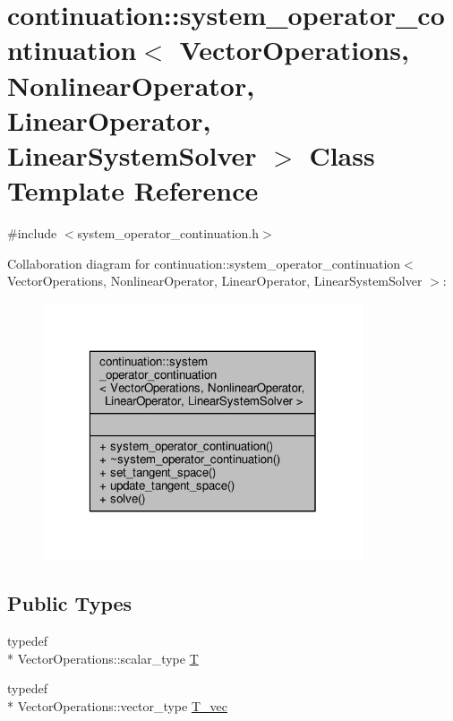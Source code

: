 \hypertarget{classcontinuation_1_1system__operator__continuation}{\section{continuation\-:\-:system\-\_\-operator\-\_\-continuation$<$ Vector\-Operations, Nonlinear\-Operator, Linear\-Operator, Linear\-System\-Solver $>$ Class Template Reference}
\label{classcontinuation_1_1system__operator__continuation}
}


{\ttfamily \#include $<$system\-\_\-operator\-\_\-continuation.\-h$>$}



Collaboration diagram for continuation\-:\-:system\-\_\-operator\-\_\-continuation$<$ Vector\-Operations, Nonlinear\-Operator, Linear\-Operator, Linear\-System\-Solver $>$\-:
\nopagebreak
\begin{figure}[H]
\begin{center}
\leavevmode
\includegraphics[width=268pt]{classcontinuation_1_1system__operator__continuation__coll__graph}
\end{center}
\end{figure}
\subsection*{Public Types}
\begin{DoxyCompactItemize}
\item 
typedef \\*
Vector\-Operations\-::scalar\-\_\-type \hyperlink{classcontinuation_1_1system__operator__continuation_a56f40eb91ed7d8435aac8fa97d7ebdf1}{T}
\item 
typedef \\*
Vector\-Operations\-::vector\-\_\-type \hyperlink{classcontinuation_1_1system__operator__continuation_a429826adb9f5e048cc54fc0d2a871080}{T\-\_\-vec}
\end{DoxyCompactItemize}
